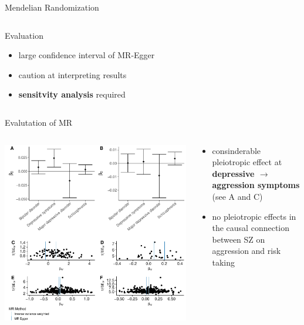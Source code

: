 \documentclass{beamer}
\begin{document}
\begin{frame}[t]{Mendelian Randomization}
\begin{columns}[T]
\begin{column}[T]{0.5\textwidth}
        \begin{block}{\tiny Evaluation}
          \begin{itemize}
            \item large confidence interval of MR-Egger
            \item caution at interpreting results
            \item \textbf{sensitvity analysis} required
          \end{itemize}
        \end{block} 
      \end{column}
    \end{columns}
  \end{frame}

  \begin{frame}[t]{Evalutation of MR}
    \tiny
    \begin{columns}[T]
      \begin{column}[T]{0.6\textwidth}
        \includegraphics[width=0.99\linewidth]{../ukb_psychiatric/figures/sensitvity_plot.pdf}
      \end{column}
      \begin{column}[T]{0.4\textwidth}
        \begin{itemize}
          \item consinderable pleiotropic effect at \textbf{depressive $\rightarrow$ aggression symptoms} (see A and C)
          \item no pleiotropic effects in the causal connection between SZ on aggression and risk taking 
        \end{itemize}
      \end{column}
    \end{columns}
  \end{frame}
\end{document}
